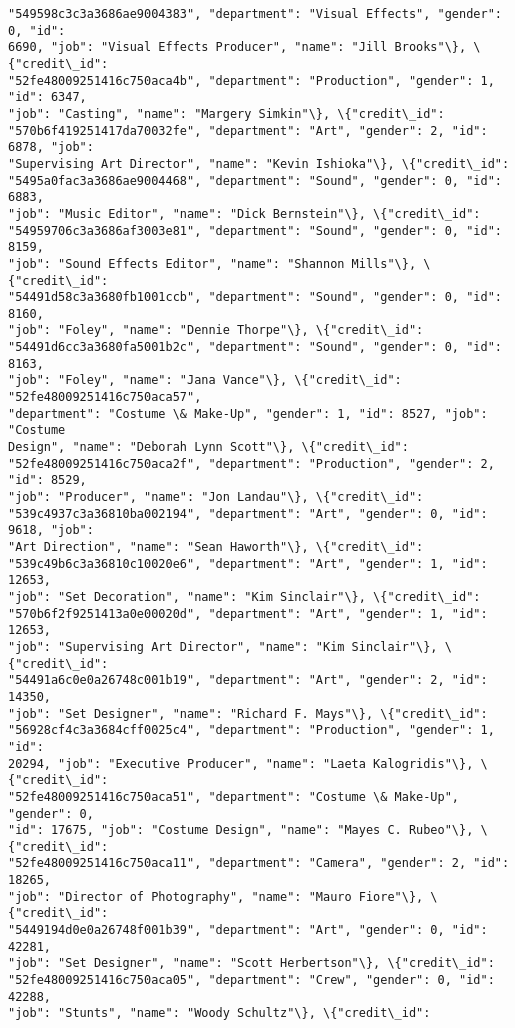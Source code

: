 \documentclass[11pt]{article}
\begin{document}
\begin{tcolorbox}[breakable, size=fbox, boxrule=.5pt, pad at break*=1mm, opacityfill=0]
\begin{Verbatim}[commandchars=\\\{\}]
"549598c3c3a3686ae9004383", "department": "Visual Effects", "gender": 0, "id":
6690, "job": "Visual Effects Producer", "name": "Jill Brooks"\}, \{"credit\_id":
"52fe48009251416c750aca4b", "department": "Production", "gender": 1, "id": 6347,
"job": "Casting", "name": "Margery Simkin"\}, \{"credit\_id":
"570b6f419251417da70032fe", "department": "Art", "gender": 2, "id": 6878, "job":
"Supervising Art Director", "name": "Kevin Ishioka"\}, \{"credit\_id":
"5495a0fac3a3686ae9004468", "department": "Sound", "gender": 0, "id": 6883,
"job": "Music Editor", "name": "Dick Bernstein"\}, \{"credit\_id":
"54959706c3a3686af3003e81", "department": "Sound", "gender": 0, "id": 8159,
"job": "Sound Effects Editor", "name": "Shannon Mills"\}, \{"credit\_id":
"54491d58c3a3680fb1001ccb", "department": "Sound", "gender": 0, "id": 8160,
"job": "Foley", "name": "Dennie Thorpe"\}, \{"credit\_id":
"54491d6cc3a3680fa5001b2c", "department": "Sound", "gender": 0, "id": 8163,
"job": "Foley", "name": "Jana Vance"\}, \{"credit\_id": "52fe48009251416c750aca57",
"department": "Costume \& Make-Up", "gender": 1, "id": 8527, "job": "Costume
Design", "name": "Deborah Lynn Scott"\}, \{"credit\_id":
"52fe48009251416c750aca2f", "department": "Production", "gender": 2, "id": 8529,
"job": "Producer", "name": "Jon Landau"\}, \{"credit\_id":
"539c4937c3a36810ba002194", "department": "Art", "gender": 0, "id": 9618, "job":
"Art Direction", "name": "Sean Haworth"\}, \{"credit\_id":
"539c49b6c3a36810c10020e6", "department": "Art", "gender": 1, "id": 12653,
"job": "Set Decoration", "name": "Kim Sinclair"\}, \{"credit\_id":
"570b6f2f9251413a0e00020d", "department": "Art", "gender": 1, "id": 12653,
"job": "Supervising Art Director", "name": "Kim Sinclair"\}, \{"credit\_id":
"54491a6c0e0a26748c001b19", "department": "Art", "gender": 2, "id": 14350,
"job": "Set Designer", "name": "Richard F. Mays"\}, \{"credit\_id":
"56928cf4c3a3684cff0025c4", "department": "Production", "gender": 1, "id":
20294, "job": "Executive Producer", "name": "Laeta Kalogridis"\}, \{"credit\_id":
"52fe48009251416c750aca51", "department": "Costume \& Make-Up", "gender": 0,
"id": 17675, "job": "Costume Design", "name": "Mayes C. Rubeo"\}, \{"credit\_id":
"52fe48009251416c750aca11", "department": "Camera", "gender": 2, "id": 18265,
"job": "Director of Photography", "name": "Mauro Fiore"\}, \{"credit\_id":
"5449194d0e0a26748f001b39", "department": "Art", "gender": 0, "id": 42281,
"job": "Set Designer", "name": "Scott Herbertson"\}, \{"credit\_id":
"52fe48009251416c750aca05", "department": "Crew", "gender": 0, "id": 42288,
"job": "Stunts", "name": "Woody Schultz"\}, \{"credit\_id":

\end{Verbatim}
\end{tcolorbox}
\end{document}
